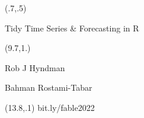 {
\begin{textblock}{7.5}(.7,.5)\fontsize{24}{24}\sf
  {\raggedright\color{Orange}\par Tidy Time Series \& Forecasting in R}
\end{textblock}
\begin{textblock}{7.5}(9.7,1.)
  {\fontsize{13}{13}\sf\color{Orange}
      \raggedright{Rob J Hyndman}\\
      \raggedright{Bahman Rostami-Tabar}
  }
\end{textblock}
\begin{textblock}{7.5}(13.8,.1)
  {\fontsize{9}{9}\sf\color{Orange}bit.ly/fable2022}
\end{textblock}
}
